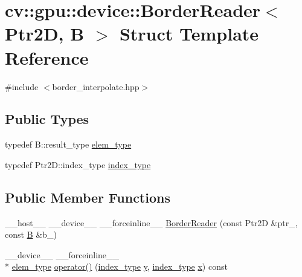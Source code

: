 \hypertarget{structcv_1_1gpu_1_1device_1_1BorderReader}{\section{cv\-:\-:gpu\-:\-:device\-:\-:Border\-Reader$<$ Ptr2\-D, B $>$ Struct Template Reference}
\label{structcv_1_1gpu_1_1device_1_1BorderReader}
}


{\ttfamily \#include $<$border\-\_\-interpolate.\-hpp$>$}

\subsection*{Public Types}
\begin{DoxyCompactItemize}
\item 
typedef B\-::result\-\_\-type \hyperlink{structcv_1_1gpu_1_1device_1_1BorderReader_a5030228ec7ba89b50ff06a7bdf3c6c24}{elem\-\_\-type}
\item 
typedef Ptr2\-D\-::index\-\_\-type \hyperlink{structcv_1_1gpu_1_1device_1_1BorderReader_ac86d4ef631131cd95a9b3fe535a0210b}{index\-\_\-type}
\end{DoxyCompactItemize}
\subsection*{Public Member Functions}
\begin{DoxyCompactItemize}
\item 
\-\_\-\-\_\-host\-\_\-\-\_\- \-\_\-\-\_\-device\-\_\-\-\_\- \-\_\-\-\_\-forceinline\-\_\-\-\_\- \hyperlink{structcv_1_1gpu_1_1device_1_1BorderReader_a629897f705f8009bcba8275e984ae4db}{Border\-Reader} (const Ptr2\-D \&ptr\-\_\-, const \hyperlink{tracking_8hpp_abfbb8a90031c2fb62897dafb4d390f6d}{B} \&b\-\_\-)
\item 
\-\_\-\-\_\-device\-\_\-\-\_\- \-\_\-\-\_\-forceinline\-\_\-\-\_\- \\*
\hyperlink{structcv_1_1gpu_1_1device_1_1BorderReader_a5030228ec7ba89b50ff06a7bdf3c6c24}{elem\-\_\-type} \hyperlink{structcv_1_1gpu_1_1device_1_1BorderReader_a11d702c36e4d6559117c842ac097ec0f}{operator()} (\hyperlink{structcv_1_1gpu_1_1device_1_1BorderReader_ac86d4ef631131cd95a9b3fe535a0210b}{index\-\_\-type} \hyperlink{highgui__c_8h_af1202c02b14870c18fb3a1da73e9e7c7}{y}, \hyperlink{structcv_1_1gpu_1_1device_1_1BorderReader_ac86d4ef631131cd95a9b3fe535a0210b}{index\-\_\-type} \hyperlink{highgui__c_8h_a6150e0515f7202e2fb518f7206ed97dc}{x}) const 
\end{DoxyCompactItemize}
